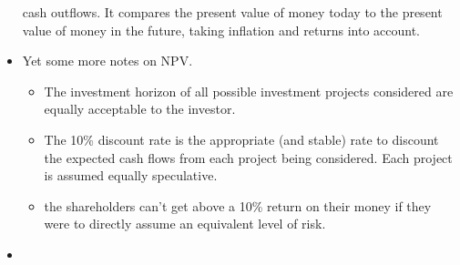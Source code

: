 \documentclass[twocolumn]{article}
\begin{document}
\begin{itemize}
  cash outflows. It compares the present value of money today to the
  present value of money in the future, taking inflation and returns
  into account. 
\item Yet some more notes on NPV.
  \begin{itemize}
  \item The investment horizon of all possible investment projects
    considered are equally acceptable to the investor.
  \item The 10\% discount rate is the appropriate (and stable) rate to
    discount the expected cash flows from each project being
    considered. Each project is assumed equally speculative. 
  \item the shareholders can't get above a 10\% return on their money
    if they were to directly assume an equivalent level of risk.  
  \end{itemize}
\item 
\end{itemize}
\end{document}
